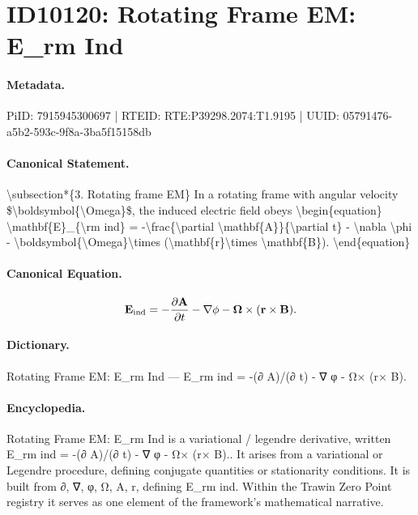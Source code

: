 \section*{ID10120: Rotating Frame EM: E\_rm Ind}
\paragraph{Metadata.}
PiID: 7915945300697 | RTEID: RTE:P39298.2074:T1.9195 | UUID: 05791476-a5b2-593c-9f8a-3ba5f15158db

\paragraph{Canonical Statement.}
\textbackslash{}subsection*\{3. Rotating frame EM\} In a rotating frame with angular velocity \$\textbackslash{}boldsymbol\{\textbackslash{}Omega\}\$, the induced electric field obeys \textbackslash{}begin\{equation\} \textbackslash{}mathbf\{E\}\_\{\textbackslash{}rm ind\} = -\textbackslash{}frac\{\textbackslash{}partial \textbackslash{}mathbf\{A\}\}\{\textbackslash{}partial t\} - \textbackslash{}nabla \textbackslash{}phi - \textbackslash{}boldsymbol\{\textbackslash{}Omega\}\textbackslash{}times (\textbackslash{}mathbf\{r\}\textbackslash{}times \textbackslash{}mathbf\{B\}). \textbackslash{}end\{equation\}

\paragraph{Canonical Equation.}
\[
\mathbf{E}_{\rm ind} = -\frac{\partial \mathbf{A}}{\partial t} - \nabla \phi - \boldsymbol{\Omega}\times (\mathbf{r}\times \mathbf{B}).
\]

\paragraph{Dictionary.}
Rotating Frame EM: E\_rm Ind — E\_rm ind = -(∂ A)/(∂ t) - ∇ φ - Ω× (r× B).

\paragraph{Encyclopedia.}
Rotating Frame EM: E\_rm Ind is a variational / legendre derivative, written E\_rm ind = -(∂ A)/(∂ t) - ∇ φ - Ω× (r× B).. It arises from a variational or Legendre procedure, defining conjugate quantities or stationarity conditions. It is built from ∂, ∇, φ, Ω, A, r, defining E\_rm ind. Within the Trawin Zero Point registry it serves as one element of the framework's mathematical narrative.
